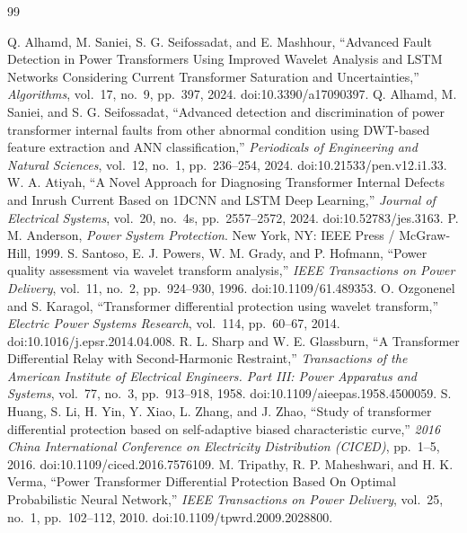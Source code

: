 \documentclass[12pt,a4paper,oneside]{report}
\begin{document}
\begin{thebibliography}{99}
 Q. Alhamd, M. Saniei, S. G. Seifossadat, and E. Mashhour, ``Advanced Fault Detection in Power Transformers Using Improved Wavelet Analysis and LSTM Networks Considering Current Transformer Saturation and Uncertainties,'' \textit{Algorithms}, vol.~17, no.~9, pp.~397, 2024. doi:10.3390/a17090397.
 Q. Alhamd, M. Saniei, and S. G. Seifossadat, ``Advanced detection and discrimination of power transformer internal faults from other abnormal condition using DWT-based feature extraction and ANN classification,'' \textit{Periodicals of Engineering and Natural Sciences}, vol.~12, no.~1, pp.~236--254, 2024. doi:10.21533/pen.v12.i1.33.
 W. A. Atiyah, ``A Novel Approach for Diagnosing Transformer Internal Defects and Inrush Current Based on 1DCNN and LSTM Deep Learning,'' \textit{Journal of Electrical Systems}, vol.~20, no.~4s, pp.~2557--2572, 2024. doi:10.52783/jes.3163.
 P. M. Anderson, \textit{Power System Protection}. New York, NY: IEEE Press / McGraw-Hill, 1999.
 S. Santoso, E. J. Powers, W. M. Grady, and P. Hofmann, ``Power quality assessment via wavelet transform analysis,'' \textit{IEEE Transactions on Power Delivery}, vol.~11, no.~2, pp.~924--930, 1996. doi:10.1109/61.489353.
 O. Ozgonenel and S. Karagol, ``Transformer differential protection using wavelet transform,'' \textit{Electric Power Systems Research}, vol.~114, pp.~60--67, 2014. doi:10.1016/j.epsr.2014.04.008.
 R. L. Sharp and W. E. Glassburn, ``A Transformer Differential Relay with Second-Harmonic Restraint,'' \textit{Transactions of the American Institute of Electrical Engineers. Part III: Power Apparatus and Systems}, vol.~77, no.~3, pp.~913--918, 1958. doi:10.1109/aieepas.1958.4500059.
 S. Huang, S. Li, H. Yin, Y. Xiao, L. Zhang, and J. Zhao, ``Study of transformer differential protection based on self-adaptive biased characteristic curve,'' \textit{2016 China International Conference on Electricity Distribution (CICED)}, pp.~1--5, 2016. doi:10.1109/ciced.2016.7576109.
 M. Tripathy, R. P. Maheshwari, and H. K. Verma, ``Power Transformer Differential Protection Based On Optimal Probabilistic Neural Network,'' \textit{IEEE Transactions on Power Delivery}, vol.~25, no.~1, pp.~102--112, 2010. doi:10.1109/tpwrd.2009.2028800.

\end{thebibliography}
\end{document}
